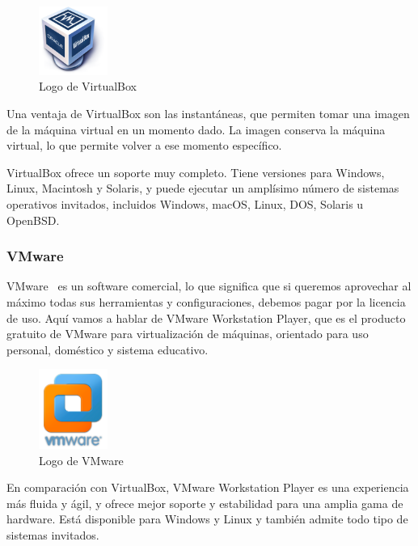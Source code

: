 	\begin{figure}[h]
	\centering
	\includegraphics[width=0.2\textwidth]{../imgs/EdA/vbox.png}
	\caption{Logo de VirtualBox}
	\label{fig:vbox}
	\end{figure}

	Una ventaja de VirtualBox son las instantáneas, que permiten tomar una imagen de la máquina virtual en un momento dado. La imagen conserva la máquina virtual, lo que permite volver a ese momento específico.

	VirtualBox ofrece un soporte muy completo. Tiene versiones para Windows, Linux, Macintosh y Solaris, y puede ejecutar un amplísimo número de sistemas operativos invitados, incluidos Windows, macOS, Linux, DOS, Solaris u OpenBSD.

\subsubsection{VMware}
	VMware~\cite{vmware} es un software comercial, lo que significa que si queremos aprovechar al máximo todas sus herramientas y configuraciones, debemos pagar por la licencia de uso. Aquí vamos a hablar de VMware Workstation Player, que es el producto gratuito de VMware para virtualización de máquinas, orientado para uso personal, doméstico y sistema educativo. 

	\begin{figure}[h]
	\centering
	\includegraphics[width=0.2\textwidth]{../imgs/EdA/vmware.png}
	\caption{Logo de VMware}
	\label{fig:vmware}
	\end{figure}

	En comparación con VirtualBox, VMware Workstation Player es una experiencia más fluida y ágil, y ofrece mejor soporte y estabilidad para una amplia gama de hardware. Está disponible para Windows y Linux y también admite todo tipo de sistemas invitados.~\cite{versus}

